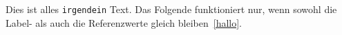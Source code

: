 Dies ist alles \texttt{irgendein} Text.\label{hallo}
Das Folgende funktioniert nur, wenn sowohl die Label- als auch die Referenzwerte gleich bleiben~\ref{hallo}.

